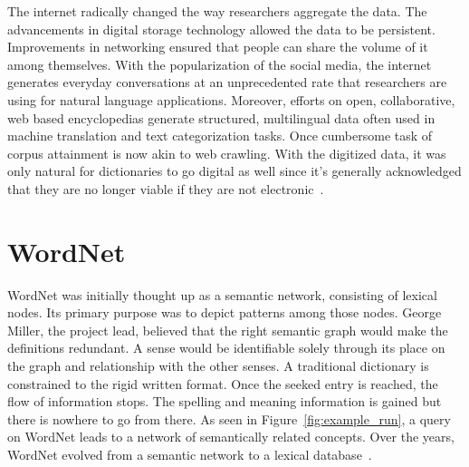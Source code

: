 The internet radically changed the way researchers aggregate the data.
The advancements in digital storage technology allowed the data to be persistent.
Improvements in networking ensured that people can share the volume of it among themselves.
With the popularization of the social media, the internet generates everyday conversations at an unprecedented rate that researchers are using for natural language applications. %
Moreover,  efforts on open, collaborative, web based encyclopedias generate structured, multilingual data often used in machine translation and text categorization tasks. %
Once cumbersome task of corpus attainment is now akin to web crawling.
With the digitized data, it was only natural for dictionaries to go digital as well since it's generally acknowledged that they are no longer viable if they are not electronic~\cite{sterkenburg_practical_2003}.

\section{WordNet}%
\label{sec:wordnet}
WordNet was initially thought up as a semantic network, consisting of lexical nodes. %
Its primary purpose was to depict patterns among those nodes.
George Miller, the project lead, believed that the right semantic graph would make the definitions redundant.
A sense would be identifiable solely through its place on the graph and relationship with the other senses.
A traditional dictionary is constrained to the rigid written format.
Once the seeked entry is reached, the flow of information stops.
The spelling and meaning information is gained but there is nowhere to go from there.
As seen in Figure~\ref{fig:example_run}, a query on WordNet leads to a network of semantically related concepts.
Over the years, WordNet evolved from a semantic network to a lexical database~\cite{fellbaum_wordnet_1998}.

